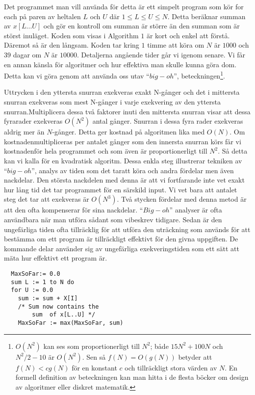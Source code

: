 \documentclass[a4paper,12pt]{article}
\begin{document}
Det programmet man vill använda för detta är ett simpelt program som kör for
each på paren av heltalen $L$ och $U$ där $1 \leq L \leq U \leq N$. Detta
beräknar summan
av $x[L...U]$ och gör en kontroll om summan är större än den summan som är
störst
inuläget. Koden som visas i Algorithm $1$ är kort och enkel att förstå. Däremot
så
är den långsam. Koden tar kring $1$ timme att köra om $N$ är $1000$ och $39$
dagar om $N$
  är $10000$. Detaljerna angående tider går vi igenom senare.
%
\newline
\newline
%
 Vi får en annan känsla för algoritmer och hur effektiva man skulle kunna göra
dom. Detta kan vi göra genom att använda oss utav $“big-oh”$,
beteckningen\footnote{$O(N^2)$ kan ses som proportionerligt till $N^2$; både
$15N^2 + 100N$ och $N^2/2 -10$ är $O(N^2)$. Sen så $f(N) = O(g(N))$ betyder att
$f(N) < cg(N)$ för en konstant $c$ och tillräckligt stora värden av $N$. En formell
definition av beteckningen kan man hitta i de flesta böcker om design av
algoritmer eller diskret matematik. }.

Uttrycken i den yttersta snurran exekveras exakt N-gånger och det i mittersta
snurran exekveras som mest N-gånger i varje exekvering av den yttersta
snurran.Multiplicera dessa två faktorer inuti den mittersta snurran visar att
dessa fyrarader exekveras $O(N^2)$ antal gånger. Snurran i dessa fyra rader
exekveras aldrig mer än $N$-gånger. Detta ger kostnad på algoritmen lika med
 $O(N)$. Om kostnadenmultipliceras per antalet gånger som den innersta snurran
körs får vi kostnadenför hela programmet och som även är proportionerligt till 
$N^2$. Så detta kan vi kalla för en kvadratisk algoritm.
%
\newline
\newline
%
Dessa enkla steg illustrerar tekniken av $“big-oh”$, analys av tiden som det
taratt köra och andra fördelar men även nackdelar. Den största nackdelen med
denna är att vi fortfarande inte vet exakt hur lång tid det tar programmet för
en
särskild input. Vi vet bara att antalet steg det tar att exekveras är $O(N^3)$.
Två stycken fördelar med denna metod är att den ofta kompenserar för sina
nackdelar. $“Big-oh”$ analyser är ofta användbara när man utföra sådant som
vibeskrev tidigare. Sedan är den ungefärliga tiden ofta tillräcklig för att
utföra den uträckning som används för att bestämma om ett program är
tillräckligt effektivt för den givna uppgiften.
%
\newline
%
De kommande delar använder sig av ungefärliga exekveringstiden som ett sätt att
mäta hur effektivt ett program är.
\newpage
\begin{center}
%
\begin{lstlisting}
  MaxSoFar:= 0.0
  sum L := 1 to N do
  for U := 0.0
  	sum := sum + X[I]
	/* Sum now contains the
		sum  of x[L..U] */
  	MaxSoFar := max(MaxSoFar, sum)
\end{lstlisting}
%
\end{center}
\end{document}
